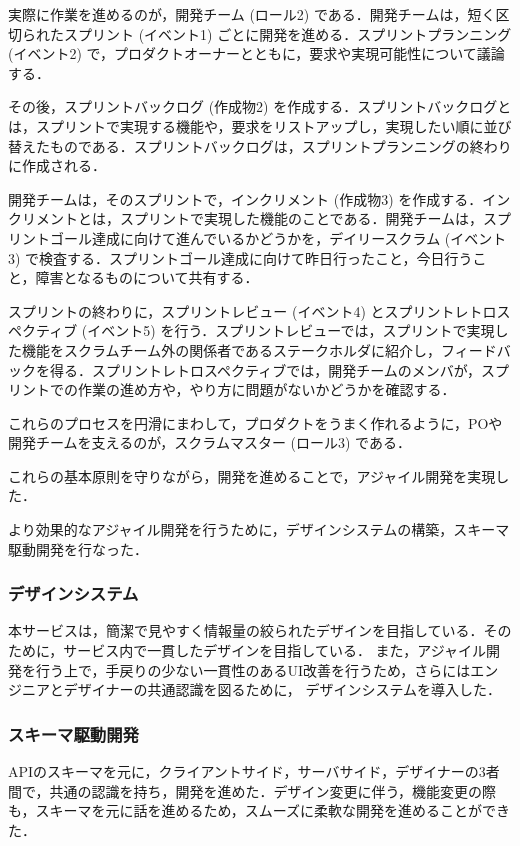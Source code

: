 実際に作業を進めるのが，開発チーム (ロール2) である．開発チームは，短く区切られたスプリント (イベント1) ごとに開発を進める．スプリントプランニング (イベント2) で，プロダクトオーナーとともに，要求や実現可能性について議論する．

その後，スプリントバックログ (作成物2) を作成する．スプリントバックログとは，スプリントで実現する機能や，要求をリストアップし，実現したい順に並び替えたものである．スプリントバックログは，スプリントプランニングの終わりに作成される．

開発チームは，そのスプリントで，インクリメント (作成物3) を作成する．インクリメントとは，スプリントで実現した機能のことである．開発チームは，スプリントゴール達成に向けて進んでいるかどうかを，デイリースクラム (イベント3) で検査する．スプリントゴール達成に向けて昨日行ったこと，今日行うこと，障害となるものについて共有する．

スプリントの終わりに，スプリントレビュー (イベント4) とスプリントレトロスペクティブ (イベント5) を行う．スプリントレビューでは，スプリントで実現した機能をスクラムチーム外の関係者であるステークホルダに紹介し，フィードバックを得る．スプリントレトロスペクティブでは，開発チームのメンバが，スプリントでの作業の進め方や，やり方に問題がないかどうかを確認する．

これらのプロセスを円滑にまわして，プロダクトをうまく作れるように，POや開発チームを支えるのが，スクラムマスター (ロール3) である．

これらの基本原則を守りながら，開発を進めることで，アジャイル開発を実現した．

より効果的なアジャイル開発を行うために，デザインシステムの構築，スキーマ駆動開発を行なった．

\subsubsection{デザインシステム}
本サービスは，簡潔で見やすく情報量の絞られたデザインを目指している．そのために，サービス内で一貫したデザインを目指している．
また，アジャイル開発を行う上で，手戻りの少ない一貫性のあるUI改善を行うため，さらにはエンジニアとデザイナーの共通認識を図るために，
デザインシステムを導入した．

\subsubsection{スキーマ駆動開発}
APIのスキーマを元に，クライアントサイド，サーバサイド，デザイナーの3者間で，共通の認識を持ち，開発を進めた．デザイン変更に伴う，機能変更の際も，スキーマを元に話を進めるため，スムーズに柔軟な開発を進めることができた．

